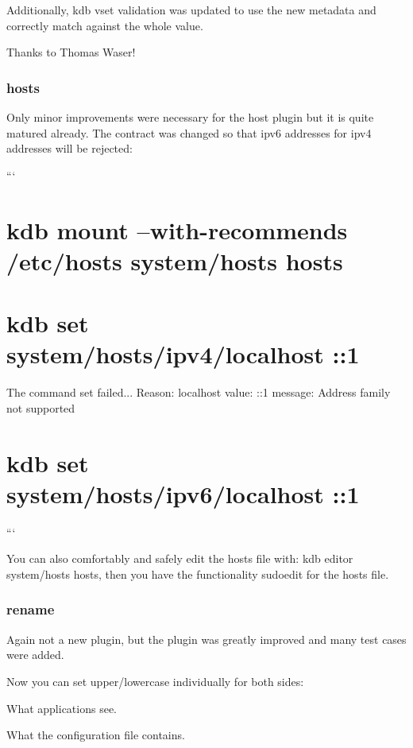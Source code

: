 Additionally, {\ttfamily kdb vset} validation was updated to use the new metadata and correctly match against the whole value.

Thanks to Thomas Waser!

\subsubsection*{hosts}

Only minor improvements were necessary for the host plugin but it is quite matured already. The contract was changed so that ipv6 addresses for ipv4 addresses will be rejected\+:

``` \section*{kdb mount --with-\/recommends /etc/hosts system/hosts hosts}

\section*{kdb set system/hosts/ipv4/localhost \+:\+:1}

The command set failed... Reason\+: localhost value\+: \+:\+:1 message\+: Address family not supported \section*{kdb set system/hosts/ipv6/localhost \+:\+:1}

```

You can also comfortably and safely edit the hosts file with\+: {\ttfamily kdb editor system/hosts hosts}, then you have the functionality {\ttfamily sudoedit} for the hosts file.

\subsubsection*{rename}

Again not a new plugin, but the plugin was greatly improved and many test cases were added.

Now you can set upper/lowercase individually for both sides\+:


\begin{DoxyEnumerate}
\item What applications see.
\item What the configuration file contains.
\end{DoxyEnumerate}

